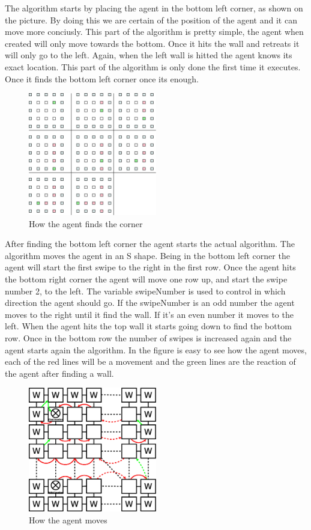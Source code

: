 	The algorithm starts by placing the agent in the bottom left corner, as shown on the picture. 
	By doing this we are certain of the position of the agent and it can move more conciusly.
	This part of the algorithm is pretty simple, the agent when created will only move towards the bottom.
	Once it hits the wall and retreats it will only go to the left.
	Again, when the left wall is hitted the agent knows its exact location.
	This part of the algorithm is only done the first time it executes.
	Once it finds the bottom left corner once its enough.

\begin{figure}[h] \label{fig:corner}	\centering
\includegraphics[width=0.5\textwidth]{find_corner}
\caption{How the agent finds the corner}
\end{figure}

After finding the bottom left corner the agent starts the actual algorithm. The
algorithm moves the agent in an S shape. Being in the bottom left corner the
agent will start the first swipe to the right in the first row.	Once the agent
hits the bottom right corner the agent will move one row up, and start the swipe
number 2, to the left.	The variable swipeNumber is used to control in which
direction the agent should go.	If the swipeNumber is an odd number the agent
moves to the right until it find the wall. If it's an even number it moves to
the left.	When the agent hits the top wall it starts going down to find the
bottom row.	Once in the bottom row the number of swipes is increased again and
the agent starts again the algorithm.	In the figure is easy to see how the agent
moves, each of the red lines will be a movement and the green lines are the
reaction of the agent after finding a wall.


\begin{figure}[h]\label{fig:simpleAlgorithm} \centering
\includegraphics[width=0.5\textwidth]{SimpleAlgorithm}
\caption{How the agent moves}
\end{figure}


